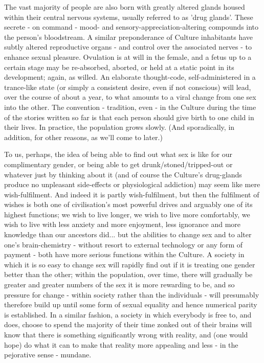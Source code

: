 The vast majority of people are also born with greatly altered glands housed within their central nervous systems, usually referred to as 'drug glands'. These secrete - on command - mood- and sensory-appreciation-altering compounds into the person's bloodstream. A similar preponderance of Culture inhabitants have subtly altered reproductive organs - and control over the associated nerves - to enhance sexual pleasure. Ovulation is at will in the female, and a fetus up to a certain stage may be re-absorbed, aborted, or held at a static point in its development; again, as willed. An elaborate thought-code, self-administered in a trance-like state (or simply a consistent desire, even if not conscious) will lead, over the course of about a year, to what amounts to a viral change from one sex into the other. The convention - tradition, even - in the Culture during the time of the stories written so far is that each person should give birth to one child in their lives. In practice, the population grows slowly. (And sporadically, in addition, for other reasons, as we'll come to later.)

To us, perhaps, the idea of being able to find out what sex is like for our complimentary gender, or being able to get drunk/stoned/tripped-out or whatever just by thinking about it (and of course the Culture's drug-glands produce no unpleasant side-effects or physiological addiction) may seem like mere wish-fulfilment. And indeed it is partly wish-fulfilment, but then the fulfilment of wishes is both one of civilisation's most powerful drives and arguably one of its highest functions; we wish to live longer, we wish to live more comfortably, we wish to live with less anxiety and more enjoyment, less ignorance and more knowledge than our ancestors did... but the abilities to change sex and to alter one's brain-chemistry - without resort to external technology or any form of payment - both have more serious functions within the Culture. A society in which it is so easy to change sex will rapidly find out if it is treating one gender better than the other; within the population, over time, there will gradually be greater and greater numbers of the sex it is more rewarding to be, and so pressure for change - within society rather than the individuals - will presumably therefore build up until some form of sexual equality and hence numerical parity is established. In a similar fashion, a society in which everybody is free to, and does, choose to spend the majority of their time zonked out of their brains will know that there is something significantly wrong with reality, and (one would hope) do what it can to make that reality more appealing and less - in the pejorative sense - mundane.

